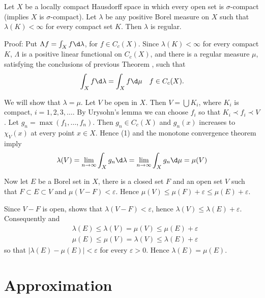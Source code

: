 \documentclass[12pt, a4paper, oneside]{book}
\begin{document}
\begin{theorem}
    Let $X$ be a locally compact Hausdorff space in which every open set is $\sigma$-compact (implies $X$ is $\sigma$-compact). Let $\lambda$ be any positive Borel measure on ${X}$ such that $\lambda(K)<\infty$ for every compact set $K$. Then $\lambda$ is regular.

    Proof:
    Put $\Lambda f=\int_X f \d  \lambda$, for $f \in C_c(X)$. Since $\lambda(K)<\infty$ for every compact $K$, $\Lambda$ is a positive linear functional on $C_c(X)$, and there is a regular measure $\mu$, satisfying the conclusions of previous Theorem , such that
    $$
        \int_X f \d  \lambda=\int_X f \d  \mu \quad f \in C_c(X).
    $$

    We will show that $\lambda=\mu$. Let $V$ be open in $X$. Then $V=\bigcup K_i$, where $K_i$ is compact, $i=1,2,3, \ldots$. By Urysohn's lemma we can choose $f_i$ so that $K_i \prec f_i \prec V$. Let $g_n=\max \left(f_1, \ldots, f_n\right)$. Then $g_n \in C_c(X)$ and $g_n(x)$ increases to $\chi_V(x)$ at every point $x \in X$. Hence (1) and the monotone convergence theorem imply
    $$
        \lambda(V)=\lim _{n \rightarrow \infty} \int_X g_n\d  \lambda=\lim _{n \rightarrow \infty} \int_X g_n \d  \mu=\mu(V)
    $$

    Now let $E$ be a Borel set in $X$, there is a closed set $F$ and an open set $V$ such that $F \subset E \subset V$ and $\mu(V-F)<\varepsilon$. Hence $\mu(V) \leq \mu(F)+\varepsilon \leq \mu(E)+\varepsilon$.

    Since $V-F$ is open, shows that $\lambda(V-F)<\varepsilon$, hence $\lambda(V) \leq \lambda(E)+\varepsilon$. Consequently
    and
    $$\begin{aligned}
             & \lambda(E) \leq \lambda(V)=\mu(V) \leq \mu(E)+\varepsilon \\
             & \mu(E) \leq \mu(V)=\lambda(V) \leq \lambda(E)+\varepsilon
        \end{aligned}$$
    so that $|\lambda(E)-\mu(E)|<\varepsilon$ for every $\varepsilon>0$. Hence $\lambda(E)=\mu(E)$.
\end{theorem}



\section{Approximation} %
\end{document}
